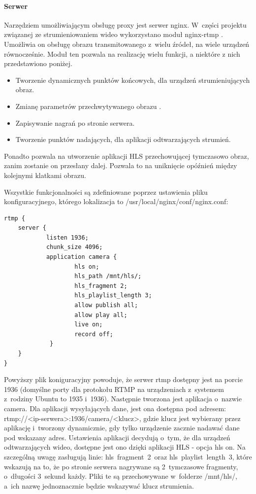 \paragraph{Serwer}
Narzędziem umożliwiającym obsługę proxy jest serwer nginx. W~części projektu związanej ze strumieniowaniem wideo wykorzystano moduł nginx-rtmp \cite{NGINX}. Umożliwia on obsługę obrazu transmitowanego z~wielu źródeł, na wiele urządzeń równocześnie. 
Moduł ten pozwala na realizację wielu funkcji, a niektóre z nich przedstawiono poniżej.
\begin{itemize}
\item Tworzenie dynamicznych punktów końcowych, dla urządzeń strumieniujących obraz.
\item Zmianę parametrów przechwytywanego obrazu .
\item Zapisywanie nagrań po stronie serwera.
\item Tworzenie punktów nadających, dla aplikacji odtwarzających strumień.
\end{itemize}
Ponadto pozwala na utworzenie aplikacji HLS przechowującej tymczasowo obraz, zanim zostanie on przesłany dalej. Pozwala to na uniknięcie opóźnień między kolejnymi klatkami obrazu.

Wszystkie funkcjonalności są zdefiniowane poprzez ustawienia pliku konfiguracyjnego, którego lokalizacja to /usr/local/nginx/conf/nginx.conf:

\begin{verbatim}
rtmp {
    server {
            listen 1936;
            chunk_size 4096;
            application camera {
                    hls on;
                    hls_path /mnt/hls/;
                    hls_fragment 2;
                    hls_playlist_length 3;
                    allow publish all;
                    allow play all;
                    live on;
                    record off;
             }
    }
}
\end{verbatim}

Powyższy plik koniguracyjny powoduje, że serwer rtmp dostępny jest na porcie 1936 (domyślne porty dla protokołu RTMP na urządzeniach z~systemem z~rodziny Ubuntu to 1935 i~1936). Następnie tworzona jest aplikacja o~nazwie camera. Dla aplikacji wysyłających dane, jest ona dostępna pod adresem: rtmp://<ip-serwera>:1936/camera/<klucz>, gdzie klucz jest wybierany przez aplikację i~tworzony dynamicznie, gdy tylko urządzenie zacznie nadawać dane pod wskazany adres.
Ustawienia aplikacji decydują o~tym, że dla urządzeń odtwarzających wideo, dostępne jest ono dzięki aplikacji HLS - opcja hls on. Na szczególną uwagę zasługują linie: hls~fragment~2~oraz hls~playlist~length~3, które wskazują na to, że po stronie serwera nagrywane są 2~tymczasowe fragmenty, o~długości 3~sekund każdy. Pliki te są przechowywane w~folderze /mnt/hls/, a~ich nazwę jednoznacznie będzie wskazywać klucz strumienia.


